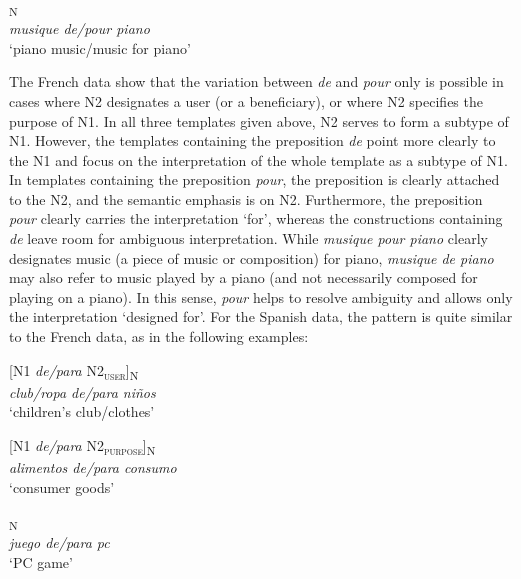 \documentclass[output=paper]{langsci/langscibook}
\begin{document}
\ea{}\textsubscript{N}\\
\textit{musique de/pour piano}\\
`piano music\slash music for piano'
\z

The French data show that the variation between \textit{de} and \textit{pour} only is possible in cases where N2 designates a user (or a beneficiary), or where N2 specifies the purpose of N1. In all three templates given above, N2 serves to form a subtype of N1. However, the templates containing the preposition \textit{de} point more clearly to the N1 and focus on the interpretation of the whole template as a subtype of N1. In templates containing the preposition \textit{pour}, the preposition is clearly attached to the N2, and the semantic emphasis is on N2. Furthermore, the preposition \textit{pour} clearly carries the interpretation `for', whereas the constructions containing \textit{de} leave room for ambiguous interpretation. While \textit{musique pour piano} clearly designates music (a piece of music or composition) for piano, \textit{musique de piano} may also refer to music played by a piano (and not necessarily composed for playing on a piano). In this sense, \textit{pour} helps to resolve ambiguity and allows only the interpretation `designed for'. For the Spanish data, the pattern is quite similar to the French data, as in the following examples: 

\begin{exe}\ex\begin{minipage}[t]{0.4\textwidth}    %
[N1 \textit{de/para} N2\textsubscript{\scshape user}]\textsubscript{N}\\
\textit{club/ropa de/para niños }\\
`children’s club/clothes'
\end{minipage}\hfill%
\begin{minipage}[t]{0.45\textwidth}
[N1 \textit{de/para} N2\textsubscript{\scshape purpose}]\textsubscript{N}\\
\textit{alimentos de/para consumo}\\
`consumer goods'
\end{minipage}\end{exe}

\ea{}\textsubscript{N}\\
\textit{juego de/para pc}\\
`PC game'
\z
\end{document}
